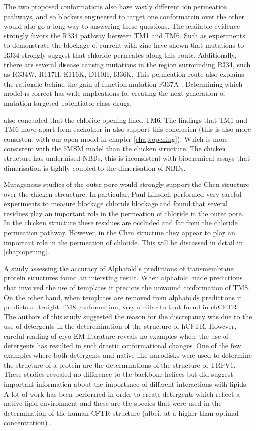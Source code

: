 The two proposed conformations also have vastly different ion permeation pathways, and so blockers engineered to target one conformatoin over the other would also go a long way to answering these questions. The available evidence strongly favors the R334 pathway between TM1 and TM6. Such as experiments to  demonstrate the blockage of current with zinc have shown that mutations to R334 strongly suggest that chloride permeates along this route. Additionally, trhere are several disease causing mutations in the region surrounding R334, such as R334W, R117H, E116K, D110H, I336K\cite{cftr2}. This permeation route also explains the rationale behind the gain of function mutation F337A \cite{}. Determining which model is correct has wide implications for creating the next generation of mutation targeted potentiator class drugs.

\cite{gao2015} also concluded that the chloride opening lined TM6. The findings that TM1 and TM6 move apart form eachother in \cite{negoda2018} also support this conclusion (this is also more consistent with our open model in chapter \ref{chap:opening}). Which is more consistent with the 6MSM model than the chicken structure.
The chicken structure has undermised NBDs, this is inconsistent with biochemical assays that dimerisation is tightly coupled to the dimerisation of NBDs\cite{vergani2005, yeh2021}.

Mutagenesis studies of the outer pore would strongly support the Chen structure over the chicken streucture. In particular, Paul Linsdell performed very careful experiments to measure blockage chloride blockage and found that several residues play an important role in the permeation of chloride in the outer pore. In the chicken structure these residues are occluded and far from the chloride permeation pathway. However, in the Chen structure they appear to play an important role in the permeation of chloride. This will be discussed in detail in \ref{chap:opening}.

A study assessing the accuracy of Alphafold's predictions of transmembrane protein structures found an intersting result. When alphafold made predictions that involved the use of templates it predicts the unwound conformation of TM8. On the other hand, when templates are removed from alphafolds predictions it predicts a straight TM8 conformation, very similar to that found in chCFTR. The authors of this study suggested the reason for the discrepancy was due to the use of detergents in the deteremination of the structure of hCFTR. However, careful reading of cryo-EM literature reveals no examples where the use of detergents has resulted in such drastic conformational changes. One of the few examples where both detergents and native-like nanodisks were used to determine the structure of a protein are the determinations of the structure of TRPV1. These studies revealed no difference to the backbone helices but did suggest important information about the importance of different interactions with lipids\cite{gao2016}. A lot of work has been performed in order to create detergents which reflect a native lipid environment and these are the species that were used in the determination of the human CFTR structure (albeit at a higher than optimal concentration) \cite{gao2016, zhang2018, kampjut2021}. 

